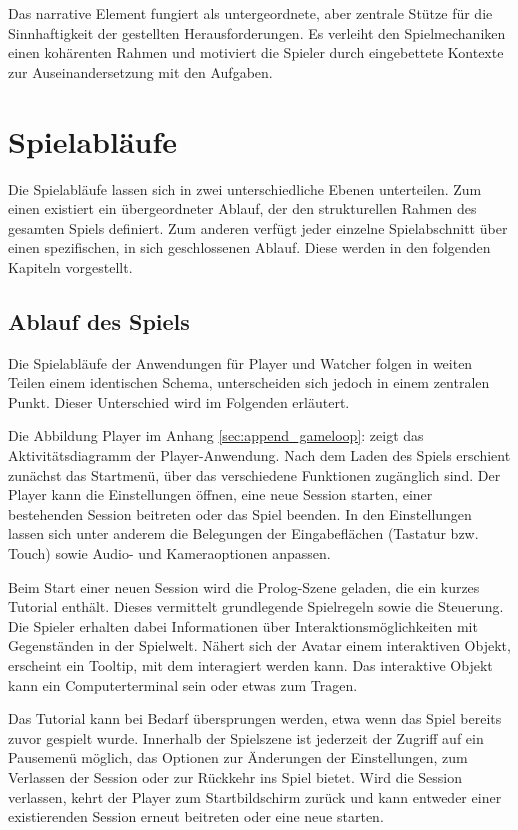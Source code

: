 Das narrative Element fungiert als untergeordnete, aber zentrale Stütze für die Sinnhaftigkeit der gestellten Herausforderungen. Es verleiht den Spielmechaniken einen kohärenten Rahmen und motiviert die Spieler durch eingebettete Kontexte zur Auseinandersetzung mit den Aufgaben.

\section{Spielabläufe}

Die Spielabläufe lassen sich in zwei unterschiedliche Ebenen unterteilen. Zum einen existiert ein übergeordneter Ablauf, der den strukturellen Rahmen des gesamten Spiels definiert. Zum anderen verfügt jeder einzelne Spielabschnitt über einen spezifischen, in sich geschlossenen Ablauf. Diese werden in den folgenden Kapiteln vorgestellt.

\subsection{Ablauf des Spiels}

Die Spielabläufe der Anwendungen für Player und Watcher folgen in weiten Teilen einem identischen Schema, unterscheiden sich jedoch in einem zentralen Punkt. Dieser Unterschied wird im Folgenden erläutert.

Die Abbildung Player im Anhang \ref{sec:append_gameloop}:  zeigt das Aktivitätsdiagramm der Player-Anwendung. Nach dem Laden des Spiels erschient zunächst das Startmenü, über das verschiedene Funktionen zugänglich sind. Der Player kann die Einstellungen öffnen, eine neue Session starten, einer bestehenden Session beitreten oder das Spiel beenden. In den Einstellungen lassen sich unter anderem die Belegungen der Eingabeflächen (Tastatur bzw. Touch) sowie Audio- und Kameraoptionen anpassen.

Beim Start einer neuen Session wird die Prolog-Szene geladen, die ein kurzes Tutorial enthält. Dieses vermittelt grundlegende Spielregeln sowie die Steuerung. Die Spieler erhalten dabei Informationen über Interaktionsmöglichkeiten mit Gegenständen in der Spielwelt. Nähert sich der Avatar einem interaktiven Objekt, erscheint ein Tooltip, mit dem interagiert werden kann. Das interaktive Objekt kann ein Computerterminal sein oder etwas zum Tragen.

Das Tutorial kann bei Bedarf übersprungen werden, etwa wenn das Spiel bereits zuvor gespielt wurde. Innerhalb der Spielszene ist jederzeit der Zugriff auf ein Pausemenü möglich, das Optionen zur Änderungen der Einstellungen, zum Verlassen der Session oder zur Rückkehr ins Spiel bietet. Wird die Session verlassen, kehrt der Player zum Startbildschirm zurück und kann entweder einer existierenden Session erneut beitreten oder eine neue starten.


